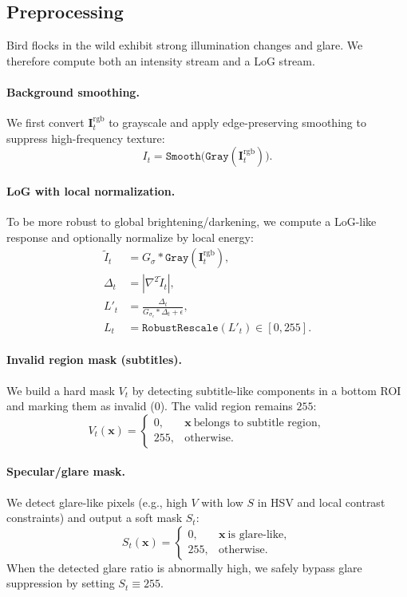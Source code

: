 \subsection{Preprocessing}
Bird flocks in the wild exhibit strong illumination changes and glare. We therefore compute both an intensity stream and a LoG stream.

\paragraph{Background smoothing.}
We first convert $\mathbf{I}^{\text{rgb}}_t$ to grayscale and apply edge-preserving smoothing to suppress high-frequency texture:
\begin{equation}
I_t = \texttt{Smooth}\big(\texttt{Gray}(\mathbf{I}^{\text{rgb}}_t)\big).
\end{equation}

\paragraph{LoG with local normalization.}
To be more robust to global brightening/darkening, we compute a LoG-like response and optionally normalize by local energy:
\begin{align}
\widetilde{I}_t &= G_{\sigma}\ast \texttt{Gray}(\mathbf{I}^{\text{rgb}}_t),\\
\Delta_t &= \left|\nabla^2 \widetilde{I}_t\right|,\\
L'_t &= \frac{\Delta_t}{G_{\sigma_e}\ast \Delta_t + \epsilon},\\
L_t &= \texttt{RobustRescale}(L'_t)\in[0,255].
\end{align}

\paragraph{Invalid region mask (subtitles).}
We build a hard mask $V_t$ by detecting subtitle-like components in a bottom ROI and marking them as invalid ($0$). The valid region remains $255$:
\begin{equation}
V_t(\mathbf{x})=
\begin{cases}
0, & \mathbf{x}\ \text{belongs to subtitle region},\\
255, & \text{otherwise}.
\end{cases}
\end{equation}

\paragraph{Specular/glare mask.}
We detect glare-like pixels (e.g., high $V$ with low $S$ in HSV and local contrast constraints) and output a soft mask $S_t$:
\begin{equation}
S_t(\mathbf{x})=
\begin{cases}
0, & \mathbf{x}\ \text{is glare-like},\\
255, & \text{otherwise}.
\end{cases}
\end{equation}
When the detected glare ratio is abnormally high, we safely bypass glare suppression by setting $S_t\equiv 255$.

